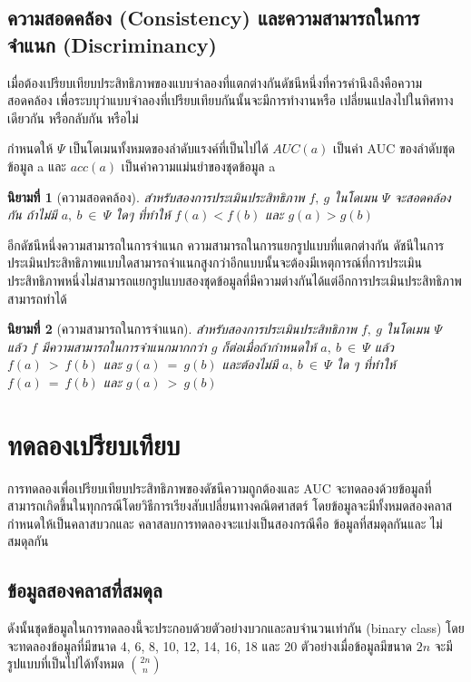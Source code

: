 \documentclass[twoside, twocolumn, 12pt]{article}
\newtheorem{mydef}{นิยามที่}
\begin{document}
\subsection{ความสอดคล้อง (Consistency) และความสามารถในการจำแนก (Discriminancy)}
\quad เมื่อต้องเปรียบเทียบประสิทธิภาพของแบบจำลองที่แตกต่างกันดัชนีหนึ่งที่ควรคำนึงถึงคือความสอดคล้อง เพื่อระบบุว่าแบบจำลองที่เปรียบเทียบกันนั้นจะมีการทำงานหรือ เปลี่ยนแปลงไปในทิศทางเดียวกัน หรือกลับกัน หรือไม่

กำหนดให้ $\Psi$ เป็นโดเมนทั้งหมดของลำดับแรงค์ที่เป็นไปได้ $AUC(a)$ เป็นค่า AUC ของลำดับชุดข้อมูล a และ  $acc(a)$ เป็นค่าความแม่นยำของชุดข้อมูล a 
\begin{mydef}[ความสอดคล้อง]\label{def:ความสอดคล้อง}
สำหรับสองการประเมินประสิทธิภาพ $f,\:g$ ในโดเมน $\Psi$ จะสอดคล้องกัน ถ้าไม่มี $a,\:b\:\in\:\Psi$ ใดๆ ที่ทำให้ $f(a) < f(b)$ และ $g(a) > g(b)$
\end{mydef}

อีกดัชนีหนึ่งความสามารถในการจำแนก ความสามารถในการแยกรูปแบบที่แตกต่างกัน ดัชนีในการประเมินประสิทธิภาพแบบใดสามารถจำแนกสูงกว่าอีกแบบนั้นจะต้องมีเหตุการณ์ที่การประเมินประสิทธิภาพหนึ่งไม่สามารถแยกรูปแบบสองชุดข้อมูลที่มีความต่างกันได้แต่อีกการประเมินประสิทธิภาพสามารถทำได้

\begin{mydef}[ความสามารถในการจำแนก]\label{def:ความสามารถในการจำแนก}
สำหรับสองการประเมินประสิทธิภาพ $f,\:g$ ในโดเมน $\Psi$ แล้ว $f$ มีความสามารถในการจำแนกมากกว่า $g$ ก็ต่อเมื่อถ้ากำหนดให้ $a,\:b\:\in\:\Psi$ แล้ว $f(a)\:>\:f(b)$ และ $g(a)\:=\:g(b)$ และต้องไม่มี $a,\:b\:\in\:\Psi$ ใด ๆ ที่ทำให้ $f(a)\:=\:f(b)$ และ $g(a)\:>\:g(b)$
\end{mydef}

\section{ทดลองเปรียบเทียบ}

\quad การทดลองเพื่อเปรียบเทียบประสิทธิภาพของดัชนีความถูกต้องและ AUC จะทดลองด้วยข้อมูลที่สามารถเกิดขึ้นในทุกกรณีโดยวิธีการเรียงสับเปลี่ยนทางคณิตศาสตร์ โดยข้อมูลจะมีทั้งหมดสองคลาสกำหนดให้เป็นคลาสบวกและ คลาสลบการทดลองจะแบ่งเป็นสองกรณีคือ ข้อมูลที่สมดุลกันและ ไม่สมดุลกัน

\subsection{ข้อมูลสองคลาสที่สมดุล}
\quad ดังนั้นชุดข้อมูลในการทดลองนี้จะประกอบด้วยตัวอย่างบวกและลบจำนวนเท่ากัน (binary class) โดยจะทดลองข้อมูลที่มีขนาด 4, 6, 8, 10, 12, 14, 16, 18 และ 20 ตัวอย่างเมื่อข้อมูลมีขนาด $2n$ จะมีรูปแบบที่เป็นไปได้ทั้งหมด ${{2n}\choose{n}}$ 
\end{document}
